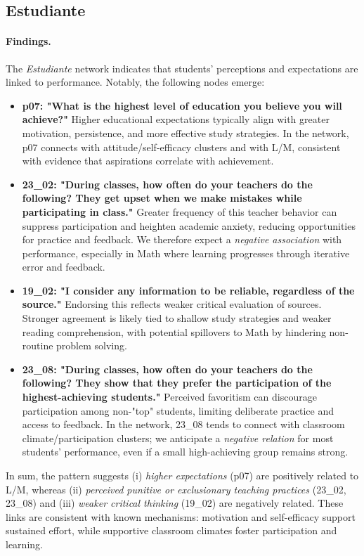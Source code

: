\documentclass[11pt, a4paper]{article}
\begin{document}
\subsection{Estudiante}
\paragraph{Findings.}
The \textit{Estudiante} network indicates that students’ perceptions and expectations are linked to performance. Notably, the following nodes emerge:
\begin{itemize}
  \item \textbf{p07: "What is the highest level of education you believe you will achieve?"} Higher educational expectations typically align with greater motivation, persistence, and more effective study strategies. In the network, p07 connects with attitude/self-efficacy clusters and with L/M, consistent with evidence that aspirations correlate with achievement.
  \item \textbf{23\_02: "During classes, how often do your teachers do the following? They get upset when we make mistakes while participating in class."} Greater frequency of this teacher behavior can suppress participation and heighten academic anxiety, reducing opportunities for practice and feedback. We therefore expect a \emph{negative association} with performance, especially in Math where learning progresses through iterative error and feedback.
  \item \textbf{19\_02: "I consider any information to be reliable, regardless of the source."} Endorsing this reflects weaker critical evaluation of sources. Stronger agreement is likely tied to shallow study strategies and weaker reading comprehension, with potential spillovers to Math by hindering non-routine problem solving.
  \item \textbf{23\_08: "During classes, how often do your teachers do the following? They show that they prefer the participation of the highest-achieving students."} Perceived favoritism can discourage participation among non-"top" students, limiting deliberate practice and access to feedback. In the network, 23\_08 tends to connect with classroom climate/participation clusters; we anticipate a \emph{negative relation} for most students’ performance, even if a small high-achieving group remains strong.
\end{itemize}
In sum, the pattern suggests (i) \emph{higher expectations} (p07) are positively related to L/M, whereas (ii) \emph{perceived punitive or exclusionary teaching practices} (23\_02, 23\_08) and (iii) \emph{weaker critical thinking} (19\_02) are negatively related. These links are consistent with known mechanisms: motivation and self-efficacy support sustained effort, while supportive classroom climates foster participation and learning.
\end{document}
